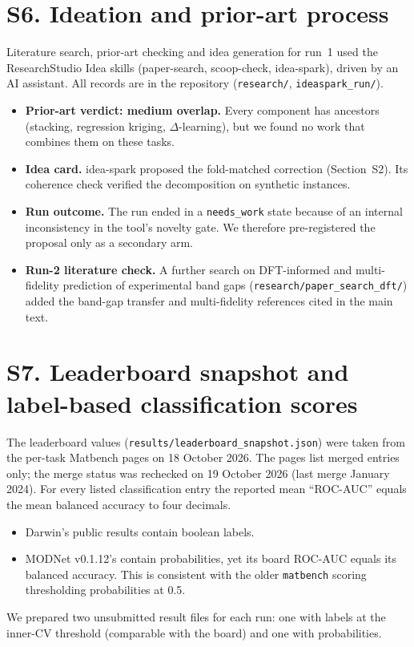 \documentclass[11pt]{article}
\begin{document}
\section*{S6. Ideation and prior-art process}
Literature search, prior-art checking and idea generation for run~1 used the ResearchStudio Idea skills (paper-search, scoop-check, idea-spark), driven by an AI assistant. All records are in the repository (\texttt{research/}, \texttt{ideaspark\_run/}).

\begin{itemize}
\item \textbf{Prior-art verdict: medium overlap.} Every component has ancestors (stacking, regression kriging, $\Delta$-learning), but we found no work that combines them on these tasks.
\item \textbf{Idea card.} idea-spark proposed the fold-matched correction (Section~S2). Its coherence check verified the decomposition on synthetic instances.
\item \textbf{Run outcome.} The run ended in a \texttt{needs\_work} state because of an internal inconsistency in the tool's novelty gate. We therefore pre-registered the proposal only as a secondary arm.
\item \textbf{Run-2 literature check.} A further search on DFT-informed and multi-fidelity prediction of experimental band gaps (\texttt{research/paper\_search\_dft/}) added the band-gap transfer and multi-fidelity references cited in the main text.
\end{itemize}

\section*{S7. Leaderboard snapshot and label-based classification scores}
The leaderboard values (\texttt{results/leaderboard\_snapshot.json}) were taken from the per-task Matbench pages on 18 October 2026. The pages list merged entries only; the merge status was rechecked on 19 October 2026 (last merge January 2024).
For every listed classification entry the reported mean ``ROC-AUC'' equals the mean balanced accuracy to four decimals.
\begin{itemize}
\item Darwin's public results contain boolean labels.
\item MODNet v0.1.12's contain probabilities, yet its board ROC-AUC equals its balanced accuracy. This is consistent with the older \texttt{matbench} scoring thresholding probabilities at 0.5.
\end{itemize}
We prepared two unsubmitted result files for each run: one with labels at the inner-CV threshold (comparable with the board) and one with probabilities.
\end{document}
